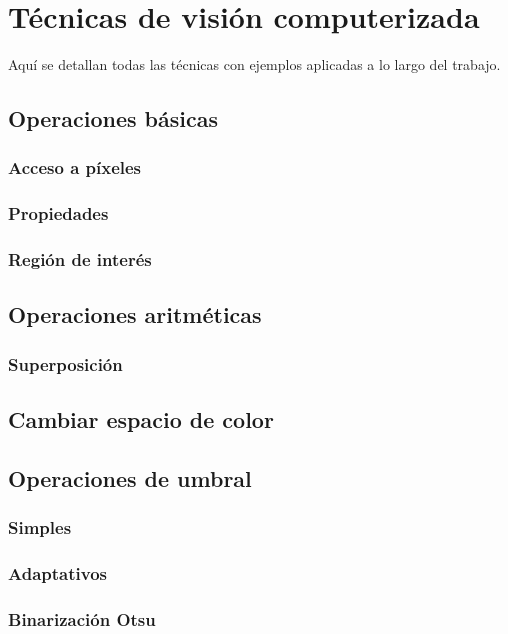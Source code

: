 \chapter{Técnicas de visión computerizada}
Aquí se detallan todas las técnicas con ejemplos aplicadas a lo largo
del trabajo.

\section{Operaciones básicas}
\subsection{Acceso a píxeles}

\subsection{Propiedades}

\subsection{Región de interés}

\section{Operaciones aritméticas}
\subsection{Superposición}

\section{Cambiar espacio de color}

\section{Operaciones de umbral}
\subsection{Simples}
\subsection{Adaptativos}
\subsection{Binarización Otsu}

